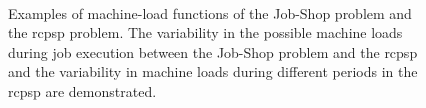 \begin{figure}[t]
    \centering
    
    \\
    
    \caption{
        Examples of machine-load functions of the Job-Shop problem and the \ac{rcpsp} problem.
        The variability in the possible machine loads during job execution
        between the Job-Shop problem and the \ac{rcpsp}
        and the variability in machine loads during different periods in the \ac{rcpsp} are demonstrated.
        }
    \label{fig:MachineLoad}
\end{figure}

